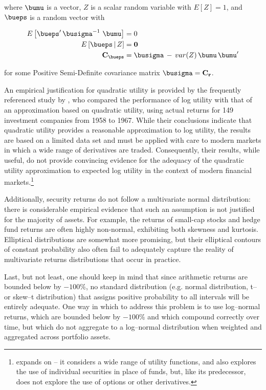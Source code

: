 \documentclass[graybox,envcountchap,sectrefs]{svmono}\usepackage[]{graphicx}\usepackage[]{xcolor}
\begin{document}
\begin{appendices}
where $\bumu$ is a vector, $Z$ is a scalar random variable with
$E\left[Z\right]=1$, and $\bueps$ is a random vector with

\begin{subequations}
\begin{align}
E\left[\bueps^{\prime}\,\busigma^{-1}\,\,\bumu\right] & =0\label{eq:rRepresentation_1}\\
E\left[\bueps\,|\,Z\right] & =\mathbf{0}\label{eq:rRepresentation_2}\\
\mathbf{C}_{\bueps} & =\busigma\,-\,var(Z)\,\bumu\,\bumu^{\prime}\label{eq:rRepresentation_3}
\end{align}
\end{subequations}

for some Positive Semi-Definite covariance matrix $\busigma=\mathbf{C}_{\mathbf{r}}$.

An empirical justification for quadratic utility is provided by the
frequently referenced study by \citet{LevyMarkowitz1979}, who compared
the performance of log utility with that of an approximation based
on quadratic utility, using actual returns for 149 investment companies
from 1958 to 1967. While their conclusions indicate that quadratic
utility provides a reasonable approximation to log utility, the results
are based on a limited data set and must be applied with care to modern
markets in which a wide range of derivatives are traded. Consequently,
their results, while useful, do not provide convincing evidence for
the adequacy of the quadratic utility approximation to expected log
utility in the context of modern financial markets.\footnote{\citet{KrollLevyMarkowitz1984} expands on \citet{Levy1979} -- it
considers a wide range of utility functions, and also explores the
use of individual securities in place of funds, but, like its predecessor,
does not explore the use of options or other derivatives.} 

Additionally, security returns do not follow a multivariate normal
distribution: there is considerable empirical evidence that such an
assumption is not justified for the majority of assets. For example,
the returns of small-cap stocks and hedge fund returns are often highly
non-normal, exhibiting both skewness and kurtosis. Elliptical distributions
are somewhat more promising, but their elliptical contours of constant
probability also often fail to adequately capture the reality of multivariate
returns distributions that occur in practice.

Last, but not least, one should keep in mind that since arithmetic
returns are bounded below by $-100\%$, no standard distribution (e.g.
normal distribution, t-- or skew--t distribution) that assigns positive
probability to all intervals will be entirely adequate. One way in
which to address this problem is to use log--normal returns, which
are bounded below by $-100\%$ and which compound correctly over time,
but which do not aggregate to a log--normal distribution when weighted
and aggregated across portfolio assets.


\end{appendices}
\end{document}
